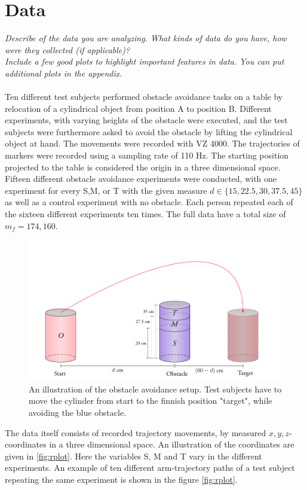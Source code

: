 \documentclass[11pt, fleqn, titlepage]{article}
\begin{document}
\section{Data}
\textit{Describe of the data you are analyzing. What kinds of data do you have, how were they collected (if applicable)? \\ Include a few good plots to highlight important features in data. You can put additional plots in the appendix.}
\\\\
Ten different test subjects performed obstacle avoidance tasks on a table by relocation of a cylindrical object from position A to position B. Different experiments, with varying heights of the obstacle were executed, and the test subjects were furthermore asked to avoid the obstacle by lifting the cylindrical object at hand. The movements were recorded with VZ 4000. The trajectories of markers were recorded using a sampling rate of 110 Hz. The starting position projected to the table is considered the origin in a three dimensional space. Fifteen different obstacle avoidance experiments were conducted, with one experiment for every S,M, or T with the given measure $ d \in \{15, 22.5,  30, 37.5, 45\} $ as well as a control experiment with no obstacle. Each person repeated each of the sixteen different experiments ten times. The full data have a total size of $ m_f = 174,160 $. \cite{armdata}
\begin{figure}[H]
	\centering
	\includegraphics[width=0.7\linewidth]{billeder/exp_pic.png}
	\caption{An illustration of the obstacle avoidance setup. Test subjects have to move the cylinder from start to the finnish position "target", while avoiding the blue obstacle.}
	\label{fig:exppic}
\end{figure}
The data itself consists of recorded trajectory movements, by measured $ x,y,z $-coordinates in a three dimensional space. An illustration of the coordinates are given in \ref{fig:rplot}. Here the variables S, M and T vary in the different experiments. An example of ten different arm-trajectory paths of a test subject repeating the same experiment is shown in the figure \ref{fig:rplot}.
\end{document}
